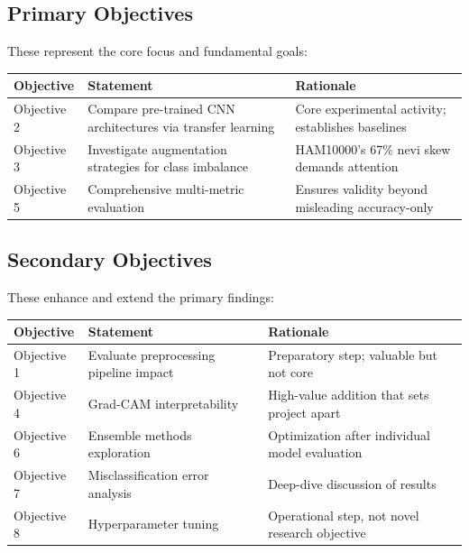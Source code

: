 \documentclass[11pt,a4paper]{article}
\begin{document}
\subsection{Primary Objectives}
These represent the core focus and fundamental goals:

\begin{longtable}{L{3cm} L{6.5cm} L{4cm}}
\toprule
\textbf{Objective} & \textbf{Statement} & \textbf{Rationale} \\
\midrule
\endfirsthead
\endhead
\bottomrule
\endlastfoot

Objective 2 & Compare pre-trained CNN architectures via transfer learning & Core experimental activity; establishes baselines \\
\midrule
Objective 3 & Investigate augmentation strategies for class imbalance & HAM10000's 67\% nevi skew demands attention \\
\midrule
Objective 5 & Comprehensive multi-metric evaluation & Ensures validity beyond misleading accuracy-only \\
\end{longtable}

\subsection{Secondary Objectives}
These enhance and extend the primary findings:

\begin{longtable}{L{3cm} L{6.5cm} L{4cm}}
\toprule
\textbf{Objective} & \textbf{Statement} & \textbf{Rationale} \\
\midrule
\endfirsthead
\endhead
\bottomrule
\endlastfoot

Objective 1 & Evaluate preprocessing pipeline impact & Preparatory step; valuable but not core \\
\midrule
Objective 4 & Grad-CAM interpretability & High-value addition that sets project apart \\
\midrule
Objective 6 & Ensemble methods exploration & Optimization after individual model evaluation \\
\midrule
Objective 7 & Misclassification error analysis & Deep-dive discussion of results \\
\midrule
Objective 8 & Hyperparameter tuning & Operational step, not novel research objective \\
\end{longtable}

\newpage

\end{document}
